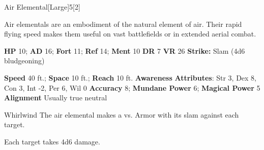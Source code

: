   \begin{monsection}{Air Elemental}[Large]{5}[2]
    \vspace{-1em}\vspace{-1em}
    \vspace{0em}

    
    Air elementals are an embodiment of the natural element of air.
    Their rapid flying speed makes them useful on vast battlefields or in extended aerial combat.
  
    

    \begin{spellcontent}
      \begin{spelltargetinginfo}
        \pari \textbf{HP} 10;
          \textbf{AD} 16;
          \textbf{Fort} 11;
          \textbf{Ref} 14;
          \textbf{Ment} 10
        \pari \textbf{DR} 7
        \pari \textbf{VR} 26
        \pari \textbf{Strike:}
            Slam  (4d6 bludgeoning)
      \end{spelltargetinginfo}
    \end{spellcontent}
    \begin{monsterfooter}
      \pari \textbf{Speed} 40 ft.;
        \textbf{Space} 10 ft.;
        \textbf{Reach} 10 ft.
      \pari \textbf{Awareness} 
      \pari \textbf{Attributes}:
        Str 3, Dex 8,
        Con 3, Int -2,
        Per 6, Wil 0
      \pari \textbf{Accuracy} 8;
        \textbf{Mundane Power} 6;
      \textbf{Magical Power} 5
      \pari \textbf{Alignment} Usually true neutral
    \end{monsterfooter}
  \end{monsection}
  \begin{freeability}{Whirlwind}
       The air elemental makes a 
         vs. Armor
        with its slam against each target.
    
    \hit Each target takes 4d6  damage.
    \end{freeability}
  
